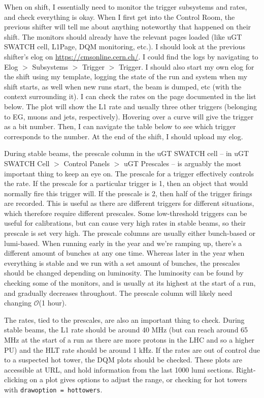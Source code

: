 When on shift, I essentially need to monitor the trigger subsystems and rates, and check everything is okay. When I first get into the Control Room, the previous shifter will tell me about anything noteworthy that happened on their shift. The monitors should already have the relevant pages loaded (like uGT SWATCH cell, L1Page, DQM monitoring, etc.). I should look at the previous shifter's elog on \url{https://cmsonline.cern.ch/}. I could find the logs by navigating to Elog $>$ Subsystems $>$ Trigger $>$ Trigger. I should also start my own elog for the shift using my template, logging the state of the run and system when my shift starts, as well when new runs start, the beam is dumped, etc (with the context surrounding it). I can check the rates on the page documented in the list below. The plot will show the L1 rate and usually three other triggers (belonging to EG, muons and jets, respectively). Hovering over a curve will give the trigger as a bit number. Then, I can navigate the table below to see which trigger corresponds to the number. At the end of the shift, I should upload my elog.

During stable beams, the prescale column in the uGT SWATCH cell -- in uGT SWATCH Cell
$>$ Control Panels $>$ uGT Prescales -- is arguably the most important thing to keep an eye on. The prescale for a trigger effectively controls the rate. If the prescale for a particular trigger is 1, then an object that would normally fire this trigger will. If the prescale is 2, then half of the trigger firings are recorded. This is useful as there are different triggers for different situations, which therefore require different prescales. Some low-threshold triggers can be useful for calibrations, but can cause very high rates in stable beams, so their prescale is set very high. The prescale columns are usually either bunch-based or lumi-based. When running early in the year and we're ramping up, there's a different amount of bunches at any one time. Whereas later in the year when everything is stable and we run with a set amount of bunches, the prescales should be changed depending on luminosity. The luminosity can be found by checking some of the monitors, and is usually at its highest at the start of a run, and gradually decreases throughout. The prescale column will likely need changing $\mathcal{O}$(1 hour).

The rates, tied to the prescales, are also an important thing to check. During stable beams, the L1 rate should be around 40 MHz (but can reach around 65 MHz at the start of a run as there are more protons in the LHC and so a higher PU) and the HLT rate should be around 1 kHz. If the rates are out of control due to a suspected hot tower, the DQM plots should be checked. These plots are accessible at URL, and hold information from the last 1000 lumi sections. Right-clicking on a plot gives options to adjust the range, or checking for hot towers with \texttt{drawoption = hottowers}.



